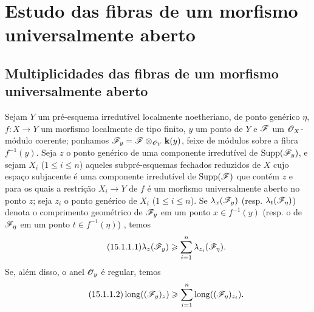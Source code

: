 \section{Estudo das fibras de um morfismo universalmente aberto}
\label{section:IV.15}

\subsection{Multiplicidades das fibras de um morfismo universalmente aberto}
\label{subsection:IV.15.1}

\begin{proposition}[15.1.1]
\label{IV.15.1.1}
Sejam $Y$ um pré-esquema irredutível localmente noetheriano, de ponto genérico $\eta$, $f:X\to Y$ um morfismo localmente de tipo finito, $y$ um ponto de $Y$ e $\mathscr{F}$ um $\mathscr{O}_X$-módulo coerente; ponhamos $\mathscr{F}_y=\mathscr{F}\otimes_{\mathscr{O}_Y}\mathbf{k}(y)$, feixe de módulos sobre a fibra $f^{-1}(y)$.
Seja $z$ o ponto genérico de uma componente irredutível de $\operatorname{Supp}(\mathscr{F}_y)$, e sejam $X_i$ ($1\leqslant i\leqslant n$) aqueles subpré-esquemas fechados reduzidos de $X$ cujo espaço subjacente é uma componente irredutível de $\operatorname{Supp}(\mathscr{F})$ que contém $z$ e para os quais a restrição $X_i\to Y$ de $f$ é um morfismo universalmente aberto no ponto $z$; seja $z_i$ o ponto genérico de $X_i$ ($1\leqslant i\leqslant n$).
Se $\lambda_x(\mathscr{F}_y)$ (resp. $\lambda_t(\mathscr{F}_\eta)$) denota o comprimento geométrico de $\mathscr{F}_y$ em um ponto $x\in f^{-1}(y)$ (resp. o de $\mathscr{F}_\eta$ em um ponto $t\in f^{-1}(\eta)$) , temos
\[
\tag{15.1.1.1}
\label{IV.15.1.1.1}
  \lambda_z(\sh{F}_y)\geqslant\sum_{i=1}^{n}\lambda_{z_i}(\sh{F}_\eta).
\]
Se, além disso, o anel $\mathscr{O}_y$ é regular, temos
\[
\tag{15.1.1.2}
\label{IV.15.1.1.2}
  \operatorname{long}((\sh{F}_y)_z)\geqslant\sum_{i=1}^{n}\operatorname{long}((\sh{F}_\eta)_{z_i}).
\]
\end{proposition}

